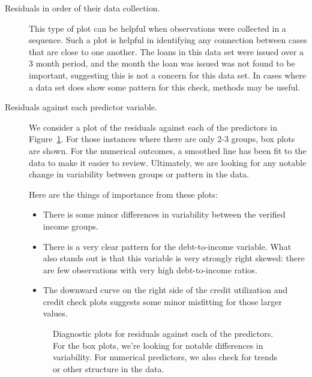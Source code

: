 \begin{description}
\item[Residuals in order of their data collection.]
    This type of plot can be helpful when observations were
    collected in a sequence.
    Such a plot is helpful in identifying any connection
    between cases that are close to one another.
    The loans in this data set were issued over a 3 month period,
    and the month the loan was issued was not found to be important,
    suggesting this is not a concern for this data set.
    In cases where a data set does show some pattern
    for this check,  methods may be useful.

\item[Residuals against each predictor variable.]
    We consider a plot of the residuals against each of
    the predictors in Figure~\ref{loansDiagEvsVariables}.
    For those instances where there are only 2-3 groups,
    box plots are shown.
    For the numerical outcomes, a smoothed line has been
    fit to the data to make it easier to review.
    Ultimately, we are looking for any notable change
    in variability between groups or pattern in the data.

    Here are the things of importance from these plots:
    \begin{itemize}
    \item
        There is some minor differences in variability
        between the verified income groups.
    \item
        There is a very clear pattern for the
        debt-to-income variable.
        What also stands out is that this variable
        is very strongly right skewed:
        there are few observations with very high
        debt-to-income ratios.
    \item
        The downward curve on the right side of the
        credit utilization and credit check plots suggests
        some minor misfitting for those larger values.
    \end{itemize}

\begin{figure}
  \centering
  \caption{Diagnostic plots for residuals against each of the
      predictors.
      For the box plots, we're looking for notable differences
      in variability.
      For numerical predictors, we also check for trends
      or other structure in the data.}
  \label{loansDiagEvsVariables}
\end{figure}

\end{description}

